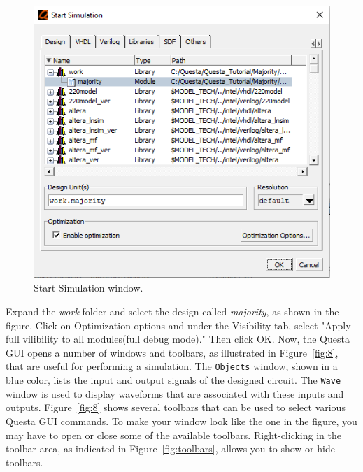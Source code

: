\documentclass[11pt, twoside, pdftex]{article}
\begin{document}
\begin{figure}[H]
   \begin{center}
      \includegraphics[scale=0.75]{figures/figure7.png}
   \caption{Start Simulation window.} 
	 \label{fig:7}
	 \end{center}
\end{figure}

Expand the {\it work} folder and select the design called {\it majority}, as shown in the
figure. Click on Optimization options and under the Visibility tab, select "Apply full vilibility to all modules(full debug mode)." Then click {\sf OK}. Now, the Questa GUI opens a number of windows and toolbars, 
as illustrated in Figure~\ref{fig:8}, that are useful for performing a simulation.  
The \texttt{Objects} window, shown in a blue color, lists the input and output signals 
of the designed circuit. The \texttt{Wave} window is used to display waveforms that are
associated with these inputs and outputs. Figure~\ref{fig:8} shows several toolbars 
that can be used to select various Questa GUI commands. To make your window look like 
the one in the figure, you may have to open or close some of the available toolbars. 
{\sf Right-clicking} in the toolbar area, as indicated in Figure~\ref{fig:toolbars}, 
allows you to show or hide toolbars.
\end{document}
